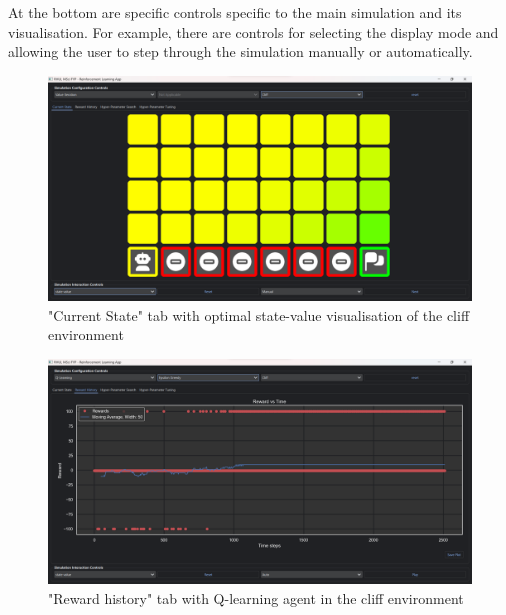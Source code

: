 \documentclass[]{final_report}
\begin{document}
At the bottom are specific controls specific to the main simulation and its visualisation. For example, there are controls for selecting the display mode and allowing the user to step through the simulation manually or automatically. 


\begin{figure}[H]
  \centering
  
  \includegraphics[trim={0 0 0 6mm},clip,width=\textwidth]{ui-screenshots/state-value-2.png}
  
  \caption{\label{fig:screenshot:current-state} "Current State" tab with optimal state-value visualisation of the cliff environment}
\end{figure}

\begin{figure}[H]
  \centering
  
  \includegraphics[trim={0 0 0 6mm},clip,width=\textwidth]{ui-screenshots/reward-history.png}
  
  \caption{\label{fig:screenshot:current-state} "Reward history" tab with Q-learning agent in the cliff environment}
\end{figure}
\end{document}
